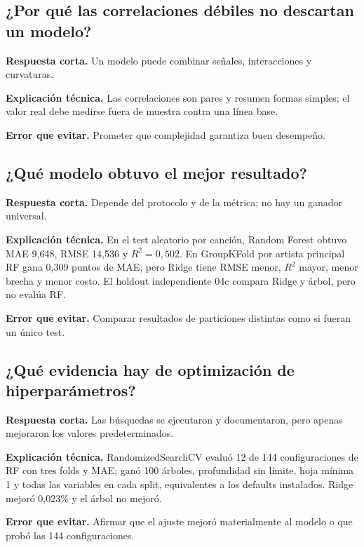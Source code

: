 \subsection*{¿Por qué las correlaciones débiles no descartan un modelo?}
\textbf{Respuesta corta.} Un modelo puede combinar señales, interacciones y curvaturas.\par
\textbf{Explicación técnica.} Las correlaciones son pares y resumen formas simples; el valor real debe
medirse fuera de muestra contra una línea base.\par
\textbf{Error que evitar.} Prometer que complejidad garantiza buen desempeño.

\subsection*{¿Qué modelo obtuvo el mejor resultado?}
\textbf{Respuesta corta.} Depende del protocolo y de la métrica; no hay un ganador universal.\par
\textbf{Explicación técnica.} En el test aleatorio por canción, Random Forest obtuvo MAE 9,648,
RMSE 14,536 y $R^2=0,502$. En GroupKFold por artista principal RF gana 0,309 puntos de MAE, pero
Ridge tiene RMSE menor, $R^2$ mayor, menor brecha y menor costo. El holdout independiente 04c
compara Ridge y árbol, pero no evalúa RF.\par
\textbf{Error que evitar.} Comparar resultados de particiones distintas como si fueran un único test.

\subsection*{¿Qué evidencia hay de optimización de hiperparámetros?}
\textbf{Respuesta corta.} Las búsquedas se ejecutaron y documentaron, pero apenas mejoraron los
valores predeterminados.\par
\textbf{Explicación técnica.} RandomizedSearchCV evaluó 12 de 144 configuraciones de RF con tres
folds y MAE; ganó 100 árboles, profundidad sin límite, hoja mínima 1 y todas las variables en cada
split, equivalentes a los defaults instalados. Ridge mejoró 0,023\% y el árbol no mejoró.\par
\textbf{Error que evitar.} Afirmar que el ajuste mejoró materialmente al modelo o que probó las 144
configuraciones.

